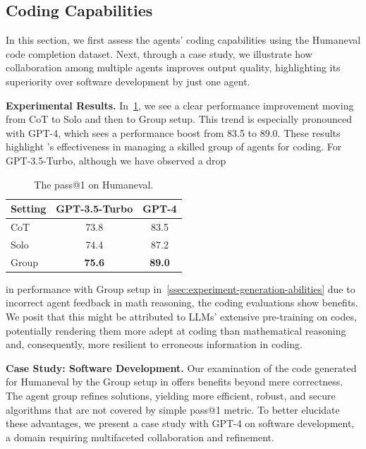 \subsection{Coding Capabilities}
\label{ssec:experiment-coding}

In this section, we first assess the agents' coding capabilities using the Humaneval code completion dataset. Next, through a case study, we illustrate how collaboration among multiple agents improves output quality, highlighting its superiority over software development by just one agent.


\textbf{Experimental Results.}
In~\cref{table:humaneval}, we see a clear performance improvement moving from CoT to Solo and then to Group setup. This trend is especially pronounced with GPT-4, which sees a performance boost from 83.5 to 89.0. These results highlight \framework's effectiveness in managing a skilled group of agents for coding. For GPT-3.5-Turbo, although we have observed a drop 
\begin{table}
    \centering
    \caption{The pass@1 on Humaneval.}
    \vspace{-0.5em}
    \begin{tabular}{l c c}
        \toprule
        \textbf{Setting} & \textbf{GPT-3.5-Turbo} & \textbf{GPT-4} \\
        \midrule
        CoT & 73.8 & 83.5 \\
        Solo & 74.4 & 87.2 \\
        Group & \textbf{75.6} & \textbf{89.0} \\
        \bottomrule
    \end{tabular}
    \label{table:humaneval}
    \vspace{-1em}
\end{table}
in performance with Group setup in~\cref{ssec:experiment-generation-abilities} due to incorrect agent feedback in math reasoning, the coding evaluations show benefits. We posit that this might be attributed to LLMs' extensive pre-training on codes, potentially rendering them more adept at coding than mathematical reasoning and, consequently, more resilient to erroneous information in coding.

\textbf{Case Study: Software Development.}
\label{sssec:experiment-coding-case}
Our examination of the code generated for Humaneval by the Group setup in \framework offers benefits beyond mere correctness. The agent group refines solutions, yielding more efficient, robust, and secure algorithms that are not covered by simple pass@1 metric. To better elucidate these advantages, we present a case study with GPT-4 on software development, a domain requiring multifaceted collaboration and refinement.


